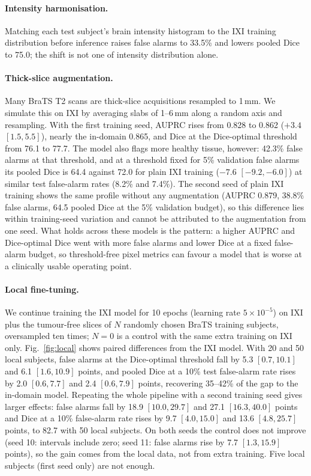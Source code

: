 \paragraph{Intensity harmonisation.}
Matching each test subject's brain intensity histogram to the IXI training distribution before inference raises false alarms to 33.5\% and lowers pooled Dice to 75.0; the shift is not one of intensity distribution alone.

\paragraph{Thick-slice augmentation.}
Many BraTS T2 scans are thick-slice acquisitions resampled to 1\,mm.
We simulate this on IXI by averaging slabs of 1--6\,mm along a random axis and resampling.
With the first training seed, AUPRC rises from 0.828 to 0.862 ($+3.4$ $[1.5, 5.5]$), nearly the in-domain 0.865, and Dice at the Dice-optimal threshold from 76.1 to 77.7.
The model also flags more healthy tissue, however: 42.3\% false alarms at that threshold, and at a threshold fixed for 5\% validation false alarms its pooled Dice is 64.4 against 72.0 for plain IXI training ($-7.6$ $[-9.2, -6.0]$) at similar test false-alarm rates (8.2\% and 7.4\%).
The second seed of plain IXI training shows the same profile without any augmentation (AUPRC 0.879, 38.8\% false alarms, 64.5 pooled Dice at the 5\% validation budget), so this difference lies within training-seed variation and cannot be attributed to the augmentation from one seed.
What holds across these models is the pattern: a higher AUPRC and Dice-optimal Dice went with more false alarms and lower Dice at a fixed false-alarm budget, so threshold-free pixel metrics can favour a model that is worse at a clinically usable operating point.

\paragraph{Local fine-tuning.}
We continue training the IXI model for 10 epochs (learning rate $5\times10^{-5}$) on IXI plus the tumour-free slices of $N$ randomly chosen BraTS training subjects, oversampled ten times; $N=0$ is a control with the same extra training on IXI only.
Fig.~\ref{fig:local} shows paired differences from the IXI model.
With 20 and 50 local subjects, false alarms at the Dice-optimal threshold fall by 5.3 $[0.7, 10.1]$ and 6.1 $[1.6, 10.9]$ points, and pooled Dice at a 10\% test false-alarm rate rises by 2.0 $[0.6, 7.7]$ and 2.4 $[0.6, 7.9]$ points, recovering 35--42\% of the gap to the in-domain model.
Repeating the whole pipeline with a second training seed gives larger effects: false alarms fall by 18.9 $[10.0, 29.7]$ and 27.1 $[16.3, 40.0]$ points and Dice at a 10\% false-alarm rate rises by 9.7 $[4.0, 15.0]$ and 13.6 $[4.8, 25.7]$ points, to 82.7 with 50 local subjects.
On both seeds the control does not improve (seed 10: intervals include zero; seed 11: false alarms rise by 7.7 $[1.3, 15.9]$ points), so the gain comes from the local data, not from extra training.
Five local subjects (first seed only) are not enough.

